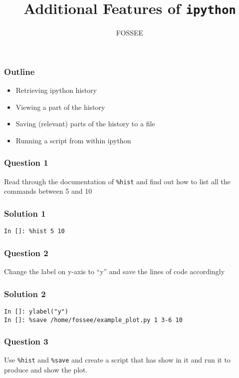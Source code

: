 \documentclass[presentation]{beamer}
\title{Additional Features of \texttt{ipython}}
\author{FOSSEE}
\date{}
\begin{document}
\maketitle










\begin{frame}
\frametitle{Outline}
\label{sec-1}

\begin{itemize}
\item Retrieving ipython history
\item Viewing a part of the history
\item Saving (relevant) parts of the history to a file
\item Running a script from within ipython
\end{itemize}
\end{frame}
\begin{frame}
\frametitle{Question 1}
\label{sec-2}

  Read through the documentation of \texttt{\%hist} and find out how to list
  all the commands between 5 and 10
\end{frame}
\begin{frame}[fragile]
\frametitle{Solution 1}
\label{sec-3}

\lstset{language=Python}
\begin{lstlisting}
In []: %hist 5 10
\end{lstlisting}
\end{frame}
\begin{frame}
\frametitle{Question 2}
\label{sec-4}

  Change the label on y-axis to ``y'' and save the lines of code
  accordingly
\end{frame}
\begin{frame}[fragile]
\frametitle{Solution 2}
\label{sec-5}

\lstset{language=Python}
\begin{lstlisting}
In []: ylabel("y")
In []: %save /home/fossee/example_plot.py 1 3-6 10
\end{lstlisting}
\end{frame}
\begin{frame}
\frametitle{Question 3}
\label{sec-6}

  Use \texttt{\%hist} and \texttt{\%save} and create a script that has show in it and
  run it to produce and show the plot.
\end{frame}
\end{document}
